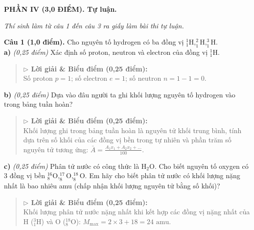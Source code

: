 \documentclass[11pt,a4paper]{article}
\begin{document}
\vspace{6pt}
{\color{myGreen}\bfseries\large PHẦN IV (3,0 ĐIỂM). Tự luận.}

\textit{\small Thí sinh làm từ câu 1 đến câu 3 ra giấy làm bài thi tự luận.}
\vspace{3pt}

\textbf{Câu 1 (1,0 điểm).} Cho nguyên tố hydrogen có ba đồng vị $^1_1\text{H}, ^2_1\text{H}, ^3_1\text{H}$.\\
\textbf{a)} \textit{(0,25 điểm)} Xác định số proton, neutron và electron của đồng vị $^1_1\text{H}$.\\
\begin{quote}\small
{\color{myBlue}\textbf{$\triangleright$ Lời giải \& Biểu điểm (0,25 điểm):}}\\
Số proton $p = 1$; số electron $e = 1$; số neutron $n = 1 - 1 = 0$.
\end{quote}

\textbf{b)} \textit{(0,25 điểm)} Dựa vào đâu người ta ghi khối lượng nguyên tố hydrogen vào trong bảng tuần hoàn?\\
\begin{quote}\small
{\color{myBlue}\textbf{$\triangleright$ Lời giải \& Biểu điểm (0,25 điểm):}}\\
Khối lượng ghi trong bảng tuần hoàn là nguyên tử khối trung bình, tính dựa trên số khối của các đồng vị bền trong tự nhiên và phần trăm số nguyên tử tương ứng: $\bar{A} = \frac{A_1 x_1 + A_2 x_2 + ...}{100}$.
\end{quote}

\textbf{c)} \textit{(0,25 điểm)} Phân tử nước có công thức là $\text{H}_2\text{O}$. Cho biết nguyên tố oxygen có 3 đồng vị bền $^{16}_8\text{O}, ^{17}_8\text{O}, ^{18}_8\text{O}$. Em hãy cho biết phân tử nước có khối lượng nặng nhất là bao nhiêu amu (chấp nhận khối lượng nguyên tử bằng số khối)?\\
\begin{quote}\small
{\color{myBlue}\textbf{$\triangleright$ Lời giải \& Biểu điểm (0,25 điểm):}}\\
Khối lượng phân tử nước nặng nhất khi kết hợp các đồng vị nặng nhất của H ($^3_1\text{H}$) và O ($^{18}_8\text{O}$): $M_\text{max} = 2 \times 3 + 18 = 24\text{ amu}$.
\end{quote}
\end{document}
